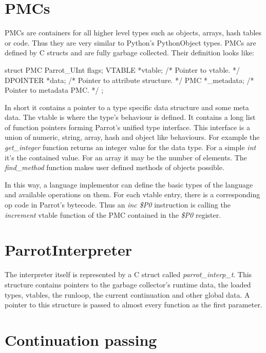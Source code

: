\documentclass[bachelor,english]{hgbthesis}
\begin{document}
\section{PMCs}

PMCs are containers for all higher level types such as objects, arrays, hash tables or code. Thus they are very similar to Python's PythonObject types. PMCs are defined by C structs and are fully garbage collected. Their definition looks like:
\begin{CCode}
struct PMC {
    Parrot_UInt    flags;
    VTABLE         *vtable;             /* Pointer to vtable. */
    DPOINTER       *data;               /* Pointer to attribute structure. */
    PMC            *_metadata;          /* Pointer to metadata PMC. */
};
\end{CCode}
In short it contains a pointer to a type specific data structure and some meta data. The vtable is where the type's behaviour is defined. It contains a long list of function pointers forming Parrot's unified type interface. This interface is a union of numeric, string, array, hash and object like behaviours. For example the  \textit{get\_integer} function returns an integer value for the data type. For a simple \textit{int} it's the contained value. For an array it may be the number of elements. The \textit{find\_method} function makes user defined methods of objects possible.

In this way, a language implementor can define the basic types of the language and available operations on them. For each vtable entry, there is a corresponding op code in Parrot's bytecode. Thus an \textit{inc \$P0} instruction is calling the \textit{increment} vtable function of the PMC contained in the \textit{\$P0} register.

\section{ParrotInterpreter}

The interpreter itself is represented by a C struct called \textit{parrot\_interp\_t}. This structure contains pointers to the garbage collector's runtime data, the loaded types, vtables, the runloop, the current continuation and other global data. A pointer to this structure is passed to almost every function as the first parameter.

\section{Continuation passing}
\end{document}
